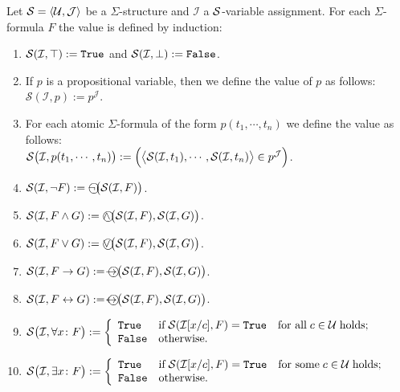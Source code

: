 \begin{Definition}
    Let $\mathcal{S} = \langle \mathcal{U}, \mathcal{J} \rangle$ be a $\Sigma$-structure and $\mathcal{I}$ a $\mathcal{S}$-variable assignment.  
    For each $\Sigma$-formula $F$ the value  is defined
    by induction:
    \begin{enumerate}
    \item $\mathcal{S}(\mathcal{I},\top) := \mathtt{True}$ and $\mathcal{S}(\mathcal{I},\bot) := \mathtt{False}$.
    \item If $p$ is a propositional variable, then we define the value of $p$ as follows:
          \\[0.2cm]
          \hspace*{1.3cm}
          $\mathcal{S}(\mathcal{I}, p) := p^\mathcal{J}$.
    \item For each atomic $\Sigma$-formula of the form $p(t_1, \cdots, t_n)$ we define the value  as follows: \\[0.2cm]
          \hspace*{1.3cm}
          $\mathcal{S}\bigl(\mathcal{I}, p(t_1,\cdots,t_n)\bigr) := 
          \Bigl(\bigl\langle \mathcal{S}(\mathcal{I}, t_1), \cdots, \mathcal{S}(\mathcal{I}, t_n) \bigr\rangle \in p^\mathcal{J}\Bigr)$.
    \item $\struct(\mathcal{I}, \neg F) := \circneg\bigl(\struct(\mathcal{I}, F)\bigr)$.
    \item $\struct(\mathcal{I}, F \wedge G) := \circwedge\bigl(\struct(\mathcal{I}, F), \struct(\mathcal{I}, G)\bigr)$.
    \item $\struct(\mathcal{I}, F \vee G) := \circvee\bigl(\struct(\mathcal{I}, F), \struct(\mathcal{I}, G)\bigr)$.
    \item $\struct(\mathcal{I}, F \rightarrow G) := \circright\bigl(\struct(\mathcal{I}, F), \struct(\mathcal{I}, G)\bigr)$.
    \item $\struct(\mathcal{I}, F \leftrightarrow G) := \circleftright\bigl(\struct(\mathcal{I}, F), \struct(\mathcal{I}, G)\bigr)$.
    \item $\mathcal{S}\bigl(\mathcal{I}, \forall x\colon F\bigr) := \left\{
      \begin{array}{ll}
         \mathtt{True}  & \mbox{if}\; \mathcal{S}(\mathcal{I}[x/c], F) = \mathtt{True}\quad \mbox{for all}\; c\in \mathcal{U}\;\mbox{holds}; \\
         \mathtt{False} & \mbox{otherwise}.
      \end{array}
      \right.$
    \item $\mathcal{S}\bigl(\mathcal{I}, \exists x \colon F\bigr) := \left\{
      \begin{array}{ll}
         \mathtt{True}  & \mbox{if}\; \mathcal{S}(\mathcal{I}[x/c], F) = \mathtt{True}\quad \mbox{for some}\; c\in \mathcal{U}\;\mbox{holds}; \\
         \mathtt{False} & \mbox{otherwise}.
      \end{array}
      \right.$\eox    
    \end{enumerate}
\end{Definition}

